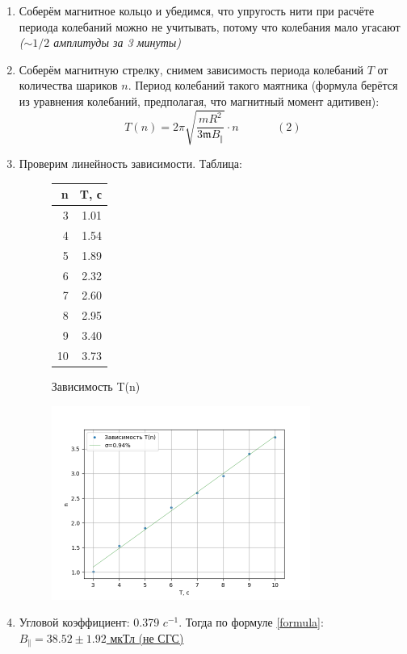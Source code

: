 \documentclass[12pt,a4paper]{article}
\newcommand{\mk}{\mathfrak}
\begin{document}
\begin{enumerate}
  \item Соберём магнитное кольцо и убедимся, что упругость
  нити при расчёте периода колебаний можно не учитывать, потому что колебания мало угасают \textit{($\sim1/2$ амплитуды за 3 минуты)}
  \item Соберём магнитную стрелку, снимем зависимость периода колебаний $T$ от количества шариков $n$. Период колебаний такого маятника \scriptsize(формула берётся из уравнения колебаний, предполагая, что магнитный момент адитивен)\normalsize:
  \begin{equation}
    T(n) = 2\pi \sqrt{\frac{mR^2}{3\mk m B_\Vert }} \cdot n\ \ \ \ \ \ \ \ \ \ \ \ \ \ \ (2)
    \label{formula}
  \end{equation}
  \item Проверим линейность зависимости. Таблица:
  \begin{figure}[H]
    \begin{tabular}{|r|r|}
    n & T, с \\
    \midrule
     3 & 1.01 \\
     4 & 1.54 \\
     5 & 1.89 \\
     6 & 2.32 \\
     7 & 2.60 \\
     8 & 2.95 \\
     9 & 3.40 \\
     10 &3.73 \\
    \end{tabular}
    \caption{Зависимость T(n)}
  \end{figure}
  \begin{figure}[H]
    \includegraphics*[width=0.8\textwidth]{T(n).png}
  \end{figure}
  \item Угловой коэффициент: 0.379 $c^{-1}$. Тогда по формуле \ref{formula}:
  \underline{$B_\Vert = 38.52 \pm 1.92$ мкТл (не СГС)} 
\end{enumerate}
\end{document}
